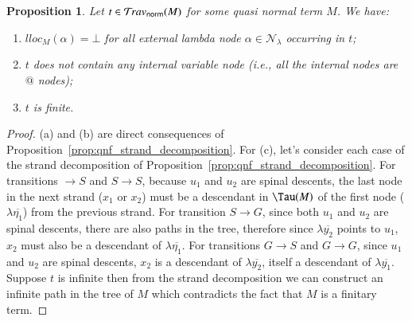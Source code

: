 \documentclass{elsarticle}
\makeatletter
\theoremstyle{plain}
\newtheorem{proposition}[theorem]{Proposition}
\theoremstyle{definition}
\newcommand\Nodes{\mathcal{N}}%
\newcommand\NodesLmd{\Nodes_\lambda}%
\newcommand{\normalizing}{{\sf norm}}
\newcommand{\travsetnorm}{\travset_\normalizing} %
\newcommand{\ctree}{\Tau} %
\renewcommand\ie{{\it i.e.\@\xspace}}
\makeatother
\begin{document}
\begin{proposition}
\label{prop:qnf_traversals_are_finite}
Let $t \in \travsetnorm(M)$ for some \emph{quasi normal} term $M$. We have:
\begin{enumerate}[label=(\alph*), nosep]
\item $lloc_M(\alpha) = \bot$ for all external lambda node $\alpha \in \NodesLmd$ occurring in $t$;
\item $t$ does not contain any internal variable node (\ie, all the internal nodes are $@$ nodes);
\item $t$ is finite.
\end{enumerate}
\end{proposition}
\begin{proof}
(a) and (b) are direct consequences of Proposition~\ref{prop:qnf_strand_decomposition}.
For (c), let's consider each case of the strand decomposition of Proposition~\ref{prop:qnf_strand_decomposition}. For transitions $\rightarrow S$ and $S \rightarrow S$, because $u_1$ and $u_2$ are spinal descents, the last node in the next strand ($x_1$ or $x_2$) must be a descendant
in $\ctree(M)$ of the first node ($\lambda\overline{\eta_1}$) from the previous strand.
For transition $S\rightarrow G$, since both $u_1$ and $u_2$ are spinal descents, there are also paths in the tree, therefore since $\lambda\overline{y_2}$ points to $u_1$, $x_2$ must also be a descendant of $\lambda\overline{\eta_1}$. For transitions $G \rightarrow S$ and $G \rightarrow G$, since $u_1$ and $u_2$ are spinal descents, $x_2$ is a descendant of $\lambda\overline{y_2}$, itself a descendant of $\lambda\overline{y_1}$.
Suppose $t$ is infinite then from the strand decomposition we can construct an infinite path in the tree of $M$ which contradicts the fact that $M$ is a finitary term.
\end{proof}
\end{document}
